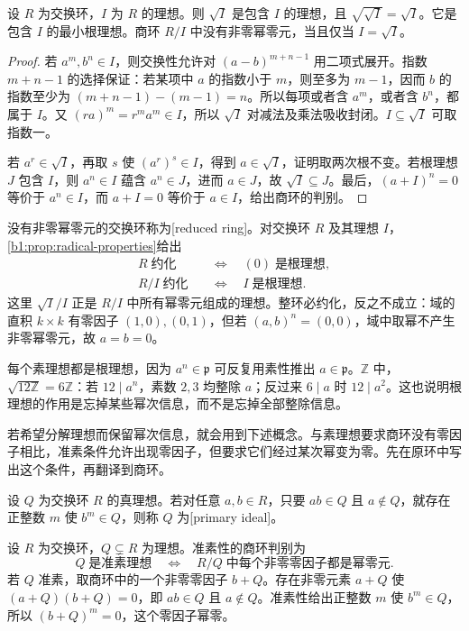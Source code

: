 \begin{proposition}\label{b1:prop:radical-properties}
	设 \(R\) 为交换环，\(I\) 为 \(R\) 的理想。则 \(\sqrt I\) 是包含 \(I\) 的理想，且 \(\sqrt{\sqrt I}=\sqrt I\)。它是包含 \(I\) 的最小根理想。商环 \(R/I\) 中没有非零幂零元，当且仅当 \(I=\sqrt I\)。
\end{proposition}
\begin{proof}
	若 \(a^m,b^n\in I\)，则交换性允许对 \((a-b)^{m+n-1}\) 用二项式展开。指数 \(m+n-1\) 的选择保证：若某项中 \(a\) 的指数小于 \(m\)，则至多为 \(m-1\)，因而 \(b\) 的指数至少为 \((m+n-1)-(m-1)=n\)。所以每项或者含 \(a^m\)，或者含 \(b^n\)，都属于 \(I\)。又 \((ra)^m=r^ma^m\in I\)，所以 \(\sqrt I\) 对减法及乘法吸收封闭。\(I\subseteq\sqrt I\) 可取指数一。

	若 \(a^r\in\sqrt I\)，再取 \(s\) 使 \((a^r)^s\in I\)，得到 \(a\in\sqrt I\)，证明取两次根不变。若根理想 \(J\) 包含 \(I\)，则 \(a^n\in I\) 蕴含 \(a^n\in J\)，进而 \(a\in J\)，故 \(\sqrt I\subseteq J\)。最后，\((a+I)^n=0\) 等价于 \(a^n\in I\)，而 \(a+I=0\) 等价于 \(a\in I\)，给出商环的判别。
\end{proof}
没有非零幂零元的交换环称为[reduced ring]。对交换环 \(R\) 及其理想 \(I\)，\cref{b1:prop:radical-properties}给出
\[
	\begin{aligned}
		R\;\text{约化}&\quad\Longleftrightarrow\quad(0)\;\text{是根理想},\\
		R/I\;\text{约化}&\quad\Longleftrightarrow\quad I\;\text{是根理想}.
	\end{aligned}
\]
这里 \(\sqrt I/I\) 正是 \(R/I\) 中所有幂零元组成的理想。整环必约化，反之不成立：域的直积 \(k\times k\) 有零因子 \((1,0),(0,1)\)，但若 \((a,b)^n=(0,0)\)，域中取幂不产生非零幂零元，故 \(a=b=0\)。

\ProseParagraphBreak
每个素理想都是根理想，因为 \(a^n\in\mathfrak p\) 可反复用素性推出 \(a\in\mathfrak p\)。\(\mathbb Z\) 中，\(\sqrt{12\mathbb Z}=6\mathbb Z\)：若 \(12\mid a^n\)，素数 \(2,3\) 均整除 \(a\)；反过来 \(6\mid a\) 时 \(12\mid a^2\)。这也说明根理想的作用是忘掉某些幂次信息，而不是忘掉全部整除信息。

\ProseParagraphBreak
若希望分解理想而保留幂次信息，就会用到下述概念。与素理想要求商环没有零因子相比，准素条件允许出现零因子，但要求它们经过某次幂变为零。先在原环中写出这个条件，再翻译到商环。
\begin{definition}\label{b1:def:primary-ideal}
	设 \(Q\) 为交换环 \(R\) 的真理想。若对任意 \(a,b\in R\)，只要 \(ab\in Q\) 且 \(a\notin Q\)，就存在正整数 \(m\) 使 \(b^m\in Q\)，则称 \(Q\) 为[primary ideal]。
\end{definition}
设 \(R\) 为交换环，\(Q\subsetneq R\) 为理想。准素性的商环判别为
\[
	Q\;\text{是准素理想} \quad\Longleftrightarrow\quad R/Q\;\text{中每个非零零因子都是幂零元}.
\]
若 \(Q\) 准素，取商环中的一个非零零因子 \(b+Q\)。存在非零元素 \(a+Q\) 使 \((a+Q)(b+Q)=0\)，即 \(ab\in Q\) 且 \(a\notin Q\)。准素性给出正整数 \(m\) 使 \(b^m\in Q\)，所以 \((b+Q)^m=0\)，这个零因子幂零。

